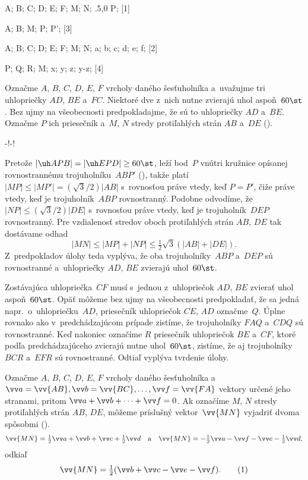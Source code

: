 {%
\fontplace
\tpoint A; \tpoint B; \lpoint C; \bpoint D;
\bpoint E; \rpoint F;
\tpoint M; \bpoint N; \lpoint\xy.5,0 P;
[1] \hfil\Obr

\fontplace
\rtpoint A; \ltpoint B;
\tpoint M; \rpoint P; \bpoint P';
[3] \hfil\Obr

\fontplace
\tpoint A; \tpoint B; \lpoint C; \bpoint D;
\bpoint E; \rpoint F;
\tpoint M; \bpoint N;
\tpoint\vv a; \rBpoint\vv b; \lBpoint\vv c;
\bpoint\vv d; \rBpoint\vv e; \lBpoint\vv f;
[2] \hfil\Obr

\fontplace
\tpoint P; \tpoint Q; \rBpoint R;
\tpoint M;
\bpoint\vv x; \lBpoint\vv y; \rBpoint\vv z;
\lpoint\vv y-\vv z;
[4] \hfil\Obr

Označme $A$, $B$, $C$, $D$, $E$, $F$ vrcholy daného šesťuholníka
a~uvažujme tri uhlopriečky $AD$, $BE$ a~$FC$. Niektoré dve z~nich
nutne zvierajú uhol aspoň~$60\st$. Bez ujmy na všeobecnosti
predpokladajme, že sú to uhlopriečky $AD$ a~$BE$. Označme $P$
ich priesečník a~$M$, $N$ stredy protiľahlých strán $AB$ a~$DE$
(\obr).

\midinsert
\centerline{\inspicture-!\hss\inspicture-!}
\endinsert

Pretože $|\uh APB|=|\uh EPD|\ge60\st$, leží bod~$P$ vnútri
kružnice opísanej rovnostrannému trojuholníku~$ABP'$ (\obr), takže platí
$|MP|\le|MP'|=(\sqrt3/2)|AB|$ s~rovnosťou práve vtedy, keď $P=P'$,
čiže práve vtedy, keď je trojuholník~$ABP$ rovnostranný. Podobne odvodíme,
že $|NP|\le(\sqrt3/2)|DE|$ s~rovnosťou práve vtedy, keď
je trojuholník~$DEP$ rovnostranný. Pre vzdialenosť stredov oboch protiľahlých
strán $AB$, $DE$ tak dostávame odhad
$$
|MN|\le|MP|+|NP|\le\tfrac12\sqrt3(|AB|+|DE|).
$$
Z~predpokladov úlohy teda vyplýva, že oba trojuholníky~$ABP$ a~$DEP$ sú
rovnostranné a~uhlopriečky $AD$, $BE$ zvierajú uhol~$60\st$.

Zostávajúca uhlopriečka~$CF$ musí s~jednou z~uhlopriečok $AD$, $BE$
zvierať uhol aspoň~$60\st$. Opäť môžeme bez ujmy na všeobecnosti
predpokladať, že sa jedná napr.~o~uhlopriečku~$AD$, priesečník
uhlopriečok $CE$, $AD$ označme~$Q$. Úplne rovnako ako v~predchádzajúcom
prípade zistíme, že trojuholníky $FAQ$ a~$CDQ$ sú rovnostranné.
Keď nakoniec označíme $R$ priesečník uhlopriečok $BE$ a~$CF$, ktoré
podľa predchádzajúceho zvierajú nutne uhol~$60\st$, zistíme, že aj trojuholníky
$BCR$ a~$EFR$ sú rovnostranné. Odtiaľ vyplýva tvrdenie úlohy.

\ineriesenie
Označme $A$, $B$, $C$, $D$, $E$, $F$ vrcholy daného šesťuholníka
a~$\vv a=\vv{AB},\vv b=\vv{BC},\dots,\vv f=\vv{FA}$ vektory
určené jeho stranami, pritom $\vv a+\vv b+\dots+\vv f=0$. Ak označíme
\inspicture{}
$M$, $N$ stredy protiľahlých strán $AB$, $DE$, môžeme príslušný
vektor~$\vv{MN}$ vyjadriť dvoma spôsobmi (\obr).
$$
\vv{MN}=\tfrac12\vv a+\vv b+\vv c+\tfrac12\vv d
\quad\text{a}\quad
\vv{MN}=-\tfrac12\vv a-\vv f-\vv e-\tfrac12\vv d,
$$
odkiaľ
$$
\vv{MN}=\tfrac12(\vv b+\vv c-\vv e-\vv f).      \tag1
$$

}
